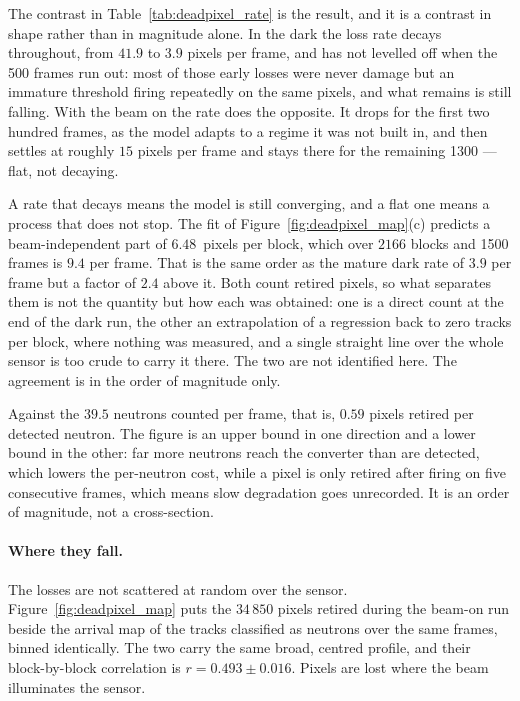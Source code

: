 \documentclass[a4paper,headsepline,oneside,11pt]{scrartcl}
\begin{document}
The contrast in Table~\ref{tab:deadpixel_rate} is the result, and it is a
contrast in shape rather than in magnitude alone. In the dark the loss rate
decays throughout, from $41.9$ to $3.9$ pixels per frame, and has not levelled
off when the 500 frames run out: most of those early losses were never damage but
an immature threshold firing repeatedly on the same pixels, and what remains is
still falling. With the beam on the rate does the opposite. It drops for the
first two hundred frames, as the model adapts to a regime it was not built in,
and then settles at roughly $15$ pixels per frame and stays there for the
remaining 1300 --- flat, not decaying.

A rate that decays means the model is still converging, and a flat one means a
process that does not stop. The fit of Figure~\ref{fig:deadpixel_map}(c) predicts a beam-independent part of
$6.48$~pixels per block, which over $2166$ blocks and 1500 frames is $9.4$ per
frame. That is the same order as the mature dark rate of $3.9$ per frame but a
factor of $2.4$ above it. Both count retired pixels, so what separates them is
not the quantity but how each was obtained: one is a direct count at the end of
the dark run, the other an extrapolation of a regression back to zero tracks per
block, where nothing was measured, and a single straight line over the whole
sensor is too crude to carry it there. The two are not identified here. The
agreement is in the order of magnitude only.

Against the $39.5$ neutrons counted per frame, that is, $0.59$ pixels retired per
detected neutron. The figure is an upper bound in one direction and a lower bound
in the other: far more neutrons reach the converter than are detected, which
lowers the per-neutron cost, while a pixel is only retired after firing on five
consecutive frames, which means slow degradation goes unrecorded. It is an order
of magnitude, not a cross-section.

\paragraph{Where they fall.} The losses are not scattered at random over the
sensor. Figure~\ref{fig:deadpixel_map} puts the $34\,850$ pixels retired during
the beam-on run beside the arrival map of the tracks classified as neutrons over
the same frames, binned identically. The two carry the same broad, centred
profile, and their block-by-block correlation is $r = 0.493 \pm 0.016$. Pixels are lost
where the beam illuminates the sensor.
\end{document}
